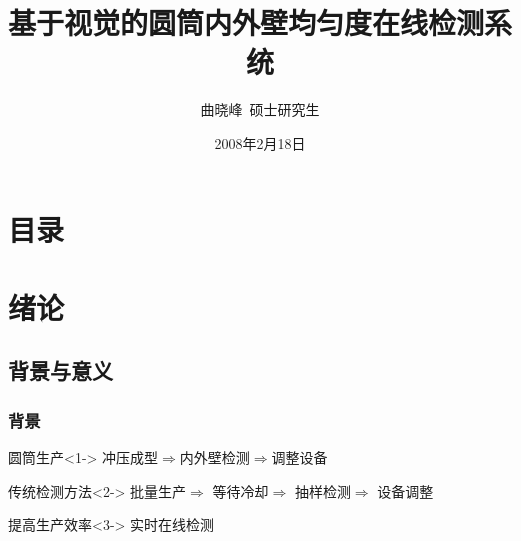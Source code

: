 \documentclass{beamer}
\begin{document}
\title{基于视觉的圆筒内外壁均匀度在线检测系统}
\author[曲晓峰]{曲晓峰\ 硕士研究生}
\date{2008年2月18日}

\frame{\titlepage}

\section*{目录}
\begin{frame}
  \frametitle{\secname}
  \tableofcontents
\end{frame}


\section{绪论}

\subsection{背景与意义}

\begin{frame}
  \frametitle{背景}
  \begin{block}{圆筒生产}<1->
    冲压成型$\Longrightarrow$内外壁检测$\Longrightarrow$调整设备
  \end{block}
  \begin{block}{传统检测方法}<2->
    批量生产$\Longrightarrow$
    等待冷却$\Longrightarrow$
    抽样检测$\Longrightarrow$
    设备调整
  \end{block}
  \begin{block}{提高生产效率}<3->
  实时在线检测
  \end{block}
\end{frame}
\end{document}

